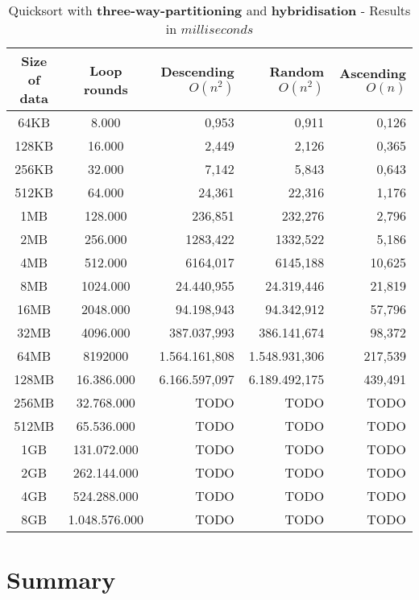 \documentclass[11pt]{amsart}
\begin{document}
\begin{table}[htdp]
	\caption{Quicksort with \textbf{three-way-partitioning} and \textbf{hybridisation} - Results in $milliseconds$}
	\begin{tabular}{|c|c|r|r|r|} \hline
		Size of data & Loop rounds & \parbox[c]{3.5cm}{Descending \\ $O(n^2)$} & \parbox[c]{3.5cm}{Random \\$O(n^2)$} & \parbox[c]{3.5cm}{Ascending \\ $O(n)$} \\ \hline
		64KB & 8.000 & 0,953 & 0,911 & 0,126 \\ \hline
		128KB & 16.000 & 2,449 & 2,126 & 0,365 \\ \hline
		256KB & 32.000 & 7,142 & 5,843 & 0,643 \\ \hline
		512KB & 64.000 & 24,361 & 22,316 & 1,176 \\ \hline
		1MB & 128.000 & 236,851 & 232,276 & 2,796 \\ \hline
		2MB & 256.000 & 1283,422 & 1332,522 & 5,186 \\ \hline
		4MB & 512.000 & 6164,017 & 6145,188 & 10,625 \\ \hline
		8MB & 1024.000 & 24.440,955 & 24.319,446 & 21,819 \\ \hline
		16MB & 2048.000 & 94.198,943 & 94.342,912 & 57,796 \\ \hline
		32MB & 4096.000 & 387.037,993 & 386.141,674 & 98,372 \\ \hline
		64MB & 8192000 & 1.564.161,808 & 1.548.931,306 & 217,539 \\ \hline
		128MB & 16.386.000 &  6.166.597,097 & 6.189.492,175 & 439,491 \\ \hline
		256MB & 32.768.000 & TODO & TODO & TODO \\ \hline
		512MB & 65.536.000 & TODO & TODO & TODO \\ \hline
		1GB & 131.072.000 & TODO & TODO & TODO \\ \hline
		2GB & 262.144.000 & TODO & TODO & TODO \\ \hline
		4GB & 524.288.000 & TODO & TODO & TODO \\ \hline
		8GB & 1.048.576.000 & TODO & TODO & TODO \\ \hline
	\end{tabular}
	\label{default}
\end{table}%


\newpage
\section{Summary}
%
%
\end{document}
